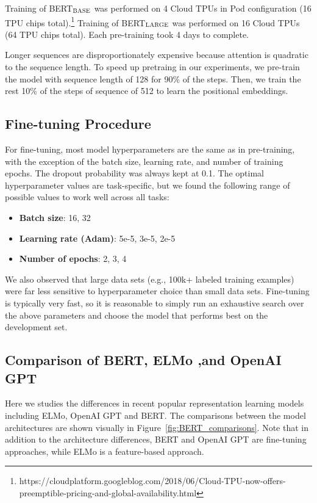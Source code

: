 \documentclass[11pt,a4paper]{article}
\newcommand\bertbase{BERT$_{\small \textsc{BASE}}$\xspace}
\newcommand\bertlarge{BERT$_{\small \textsc{LARGE}}$\xspace}
\begin{document}
Training of \bertbase was performed on 4 Cloud TPUs in Pod configuration (16 TPU chips total).\footnote{https://cloudplatform.googleblog.com/2018/06/Cloud-TPU-now-offers-preemptible-pricing-and-global-availability.html} Training of \bertlarge was performed on 16 Cloud TPUs (64 TPU chips total). Each pre-training took 4 days to complete.

Longer sequences are disproportionately expensive because attention is quadratic to the sequence length. To speed up pretraing in our experiments, we pre-train the model with sequence length of 128 for 90\% of the steps. Then, we train
the rest 10\% of the steps of sequence of 512 to learn the positional embeddings.

\subsection{Fine-tuning Procedure}
For fine-tuning, most model hyperparameters are the same as in pre-training, with the exception of the batch size, learning rate, and number of training epochs. The dropout probability was always kept at 0.1. The optimal hyperparameter values are task-specific, but we found the following range of possible values to work well across all tasks:

\begin{itemize}[noitemsep]
\item {\bf Batch size}: 16, 32
\item {\bf Learning rate (Adam)}: 5e-5, 3e-5, 2e-5
\item {\bf Number of epochs}: 2, 3, 4
\end{itemize}

We also observed that large data sets (e.g., 100k+ labeled training examples) were far less sensitive to hyperparameter choice than small data sets. Fine-tuning is typically very fast, so it is reasonable to simply run an exhaustive search over the above parameters and choose the model that performs best on the development set.

\subsection{Comparison of BERT, ELMo ,and OpenAI GPT}
\label{appendix:sec:comparing_bert_and_openai}

Here we studies the differences in recent popular representation learning
models including ELMo, OpenAI GPT and BERT.
The comparisons between the model
architectures are shown visually in Figure~\ref{fig:BERT_comparisons}. Note that
in addition to the architecture differences, BERT and OpenAI GPT are fine-tuning approaches, while ELMo is a feature-based approach.
\end{document}
